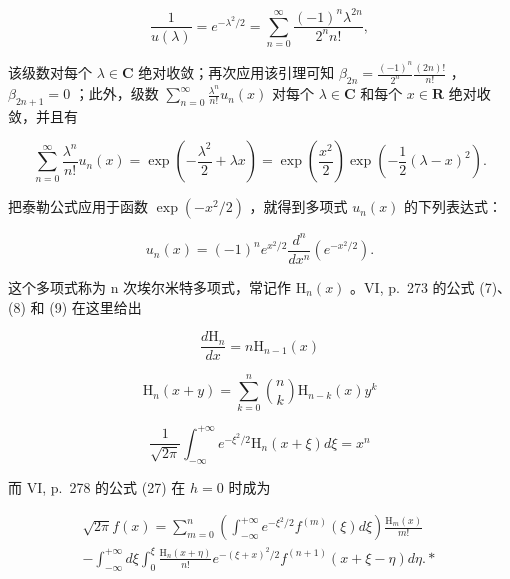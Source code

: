 \[
\frac {1}{u (\lambda)} = e ^ {- \lambda^ {2} / 2} = \sum_ {n = 0} ^ {\infty} \frac {(- 1) ^ {n} \lambda^ {2 n}}{2 ^ {n} n !},
\]

该级数对每个 \(\lambda \in \mathbf{C}\) 绝对收敛；再次应用该引理可知 \(\beta_{2n} = \frac{(-1)^n}{2^n}\frac{(2n)!}{n!}\) ，\(\beta_{2n+1} = 0\) ；此外，级数 \(\sum_{n=0}^{\infty}\frac{\lambda^n}{n!} u_n(x)\) 对每个 \(\lambda \in \mathbf{C}\) 和每个 \(x \in \mathbf{R}\) 绝对收敛，并且有

\[
\sum_ {n = 0} ^ {\infty} \frac {\lambda^ {n}}{n !} u _ {n} (x) = \exp \left(- \frac {\lambda^ {2}}{2} + \lambda x\right) = \exp \left(\frac {x ^ {2}}{2}\right) \exp \left(- \frac {1}{2} (\lambda - x) ^ {2}\right).
\]

把泰勒公式应用于函数 \(\exp(-x^2/2)\) ，就得到多项式 \(u_n(x)\) 的下列表达式：

\[
u _ {n} (x) = (- 1) ^ {n} e ^ {x ^ {2} / 2} \frac {d ^ {n}}{d x ^ {n}} (e ^ {- x ^ {2} / 2}).
\]

这个多项式称为 n 次埃尔米特多项式，常记作 \(\mathrm{H}_{n}(x)\) 。VI, p.~273 的公式 (7)、(8) 和 (9) 在这里给出

\[
\frac {d \mathrm{H} _ {n}}{d x} = n \mathrm{H} _ {n - 1} (x)
\]

\[
\mathrm{H} _ {n} (x + y) = \sum_ {k = 0} ^ {n} {\binom {n} {k}} \mathrm{H} _ {n - k} (x)   y ^ {k}
\]

\[
\frac {1}{\sqrt {2 \pi}} \int_ {- \infty} ^ {+ \infty} e ^ {- \xi^ {2} / 2} \mathrm{H} _ {n} (x + \xi) d \xi = x ^ {n}
\]

而 VI, p.~278 的公式 (27) 在 \(h = 0\) 时成为

\[
\begin{array}{l} \sqrt {2 \pi} f (x) = \sum_ {m = 0} ^ {n} \left(\int_ {- \infty} ^ {+ \infty} e ^ {- \xi^ {2} / 2} f ^ {(m)} (\xi) d \xi\right) \frac {\mathrm{H} _ {m} (x)}{m !} \\ - \int_ {- \infty} ^ {+ \infty} d \xi \int_ {0} ^ {\xi} \frac {\mathrm{H} _ {n} (x + \eta)}{n !} e ^ {- (\xi + x) ^ {2} / 2} f ^ {(n + 1)} (x + \xi - \eta) d \eta . * \end{array}
\]

